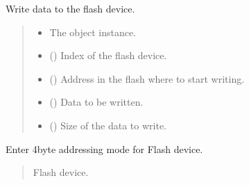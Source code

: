 \documentclass[letterpaper,10pt,english]{sphinxmanual}
\begin{document}
\begin{fulllineitems}
\begin{fulllineitems}
\label{\detokenize{cplddocs:management_flash.MngProgFlash.DeviceWrite}}
\pysigstartsignatures
{}
\pysigstopsignatures
\sphinxAtStartPar
Write data to the flash device.
\begin{quote}\begin{description}
\begin{itemize}
\item {} 
\sphinxAtStartPar
{} \textendash{} The object instance.

\item {} 
\sphinxAtStartPar
{} () \textendash{} Index of the flash device.

\item {} 
\sphinxAtStartPar
{} () \textendash{} Address in the flash where to start writing.

\item {} 
\sphinxAtStartPar
{} () \textendash{} Data to be written.

\item {} 
\sphinxAtStartPar
{} () \textendash{} Size of the data to write.

\end{itemize}

\end{description}\end{quote}

\end{fulllineitems}


\begin{fulllineitems}
\label{\detokenize{cplddocs:management_flash.MngProgFlash.FlashDevice_Enter4byteAddMode}}
\pysigstartsignatures
{}
\pysigstopsignatures
\sphinxAtStartPar
Enter 4\sphinxhyphen{}byte addressing mode for Flash device.
\begin{quote}\begin{description}
\sphinxAtStartPar
{} \textendash{} Flash device.


\end{description}
\end{quote}
\end{fulllineitems}
\end{fulllineitems}
\end{document}
